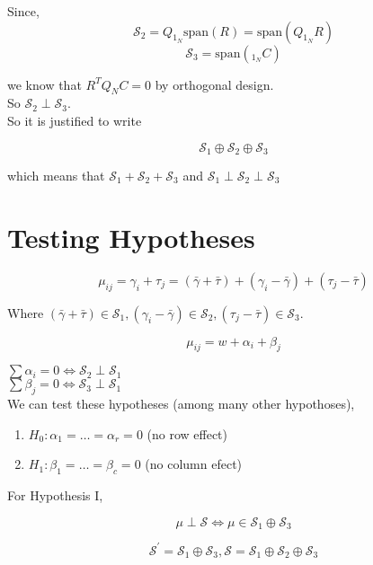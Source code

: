 \documentclass[11pt,fleqn]{book} %
\begin{document}
Since, 	
		$$ \mathcal{S}_2 = Q_{1_N} \text{span}(R) = \text{span}(Q_{1_N} R) $$ 
		$$ \mathcal{S}_3 = \text{span}(_{1_N} C) $$

we know that $R^T Q_N C = 0$ by orthogonal design. \\

So $\mathcal{S}_2 \perp \mathcal{S}_3.$\\

So it is justified to write

		$$\mathcal{S}_1 \oplus \mathcal{S}_2 \oplus \mathcal{S}_3 $$

which means that $\mathcal{S}_1 + \mathcal{S}_2 + \mathcal{S}_3 $ and $\mathcal{S}_1 \perp \mathcal{S}_2 \perp \mathcal{S}_3 $


\section{Testing Hypotheses}


		$$\mu_{ij} = \gamma_i + \tau_j = (\bar{\gamma} + \bar{\tau}) + (\gamma_i - \bar{\gamma}) + (\tau_j - \bar{\tau})$$

Where $(\bar{\gamma} + \bar{\tau}) \in \mathcal{S}_1, (\gamma_i - \bar{\gamma}) \in \mathcal{S}_2, (\tau_j - \bar{\tau}) \in \mathcal{S}_3 $. 

		$$\mu_{ij} = w + \alpha_i + \beta_j $$ 

$\sum \alpha_i = 0 \Leftrightarrow \mathcal{S}_2 \perp \mathcal{S}_1$\\
$\sum \beta_j = 0 \Leftrightarrow \mathcal{S}_3 \perp \mathcal{S}_1$\\


We can test these hypotheses (among many other hypothoses), \\

		\begin{enumerate}[label = \Roman*]
			\item $H_0: \alpha_1 = \dots = \alpha_r = 0$ (no row effect)
			\item $H_1: \beta_1 = \dots = \beta_c = 0$ (no column efect)
		\end{enumerate}



For Hypothesis I, 

		$$\mu \perp \mathcal{S} \Leftrightarrow \mu \in \mathcal{S}_1 \oplus \mathcal{S}_3 $$

		$$\mathcal{S}^\prime = \mathcal{S}_1 \oplus \mathcal{S}_3, \mathcal{S} = \mathcal{S}_1 \oplus \mathcal{S}_2 \oplus \mathcal{S}_3 $$
\end{document}
